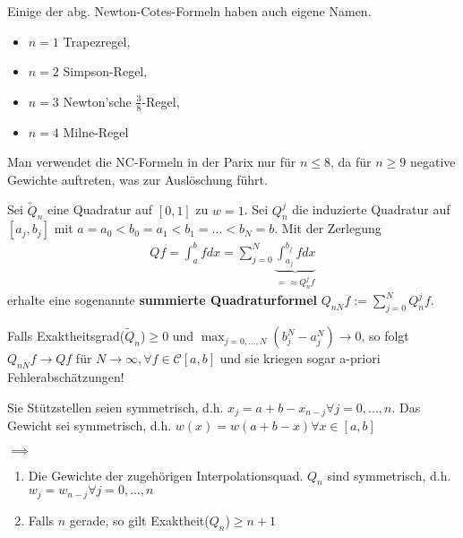 \begin{remark}
	Einige der abg. Newton-Cotes-Formeln haben auch eigene Namen.
	\begin{itemize}
		\item $n=1$ Trapezregel,
		\item $n=2$ Simpson-Regel,
		\item $n=3$ Newton'sche $\frac{3}{8}$-Regel,
		\item $n=4$ Milne-Regel
	\end{itemize}
\end{remark}

\begin{remark}
	Man verwendet die NC-Formeln in der Parix nur für $n \leq 8$, da für $n \geq 9$ negative Gewichte auftreten, was zur Auslöschung führt.
\end{remark}

\begin{remark}
	Sei $\tilde{Q}_n$ eine Quadratur auf $[0, 1]$ zu $w = 1$. Sei $Q_n^j$ die induzierte Quadratur auf $[a_j, b_j]$ mit $a = a_0 < b_0 = a_1 < b_1 = ... < b_N = b$. Mit der Zerlegung
	\begin{align*}
		Qf = \int_{a}^{b} f dx = \sum_{j=0}^{N} \underbrace{\int_{a_j}^{b_j} f dx}_{=\approx Q_n^jf}
	\end{align*}
	erhalte eine sogenannte \textbf{summierte Quadraturformel} $Q_{nN}f := \sum_{j=0}^{N} Q_n^jf$.
	
	Falls Exaktheitsgrad($\tilde{Q}_n$)$\geq 0$ und $\max_{j=0, ..., N}(b_j^N - a_j^N) \rightarrow 0$, so folgt $Q_{nN}f \rightarrow Qf$ für $N \rightarrow \infty, \forall f \in \mathcal{C}[a,b]$ und sie kriegen sogar a-priori Fehlerabschätzungen!
\end{remark}

\begin{theorem}
	Sie Stützstellen seien symmetrisch, d.h. $x_j = a + b - x_{n-j} \forall j=0, ..., n$. Das Gewicht sei symmetrisch, d.h. $w(x) = w(a+b-x) \forall x \in [a,b]$
	
	$\implies$
	\begin{enumerate}
		\item Die Gewichte der zugehörigen Interpolationsquad. $Q_n$ sind symmetrisch, d.h. $w_j = w_{n-j} \forall j=0, ..., n$
		\item Falls $n$ gerade, so gilt Exaktheit($Q_n$)$\geq n+1$
	\end{enumerate}
\end{theorem}

